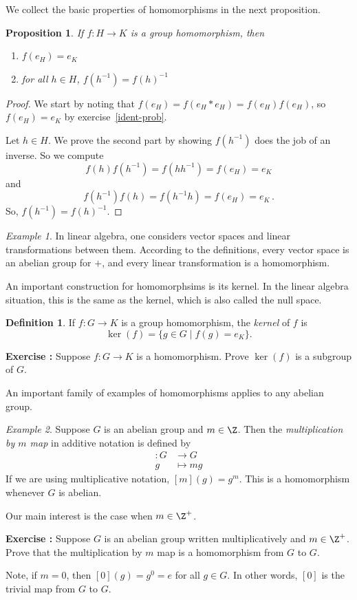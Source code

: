 \documentclass[12pt]{amsart}
\newcounter{probs}
\newenvironment{prob}{%
  \refstepcounter{probs}
  \par\medskip\noindent\textbf{Exercise \theprobs:} }{\par\medskip}
\theoremstyle{plain}
\newtheorem{prop}[thm]{Proposition}
\theoremstyle{definition}
\newtheorem{defn}[thm]{Definition}
\theoremstyle{remark}
\newtheorem*{exam}{Example}
\begin{document}
We collect the basic properties of homomorphisms in the next proposition.
\begin{prop}
If $f:H\to K$ is a group homomorphism, then
\begin{enumerate}
\item $f(e_H) = e_K$
\item for all $h\in H$, $f(h^{-1})=f(h)^{-1}$
\end{enumerate}
\end{prop}
\begin{proof}
  We start by noting that $f(e_H)=f(e_H*e_H) = f(e_H)f(e_H)$, so $f(e_H)=e_K$ by
  exercise~\ref{ident-prob}.
  
  Let $h\in H$.  We prove the second part by showing $f(h^{-1})$ does the job of an
  inverse.  So we compute
  \[ f(h)f(h^{-1}) = f(hh^{-1}) = f(e_H) = e_K\]
  and
  \[ f(h^{-1})f(h) = f(h^{-1}h) = f(e_H) = e_K\,.\]
  So, $f(h^{-1}) = f(h)^{-1}$.
\end{proof}

\begin{exam}
  In linear algebra, one considers vector spaces and linear
  transformations between them.  According to the definitions,
  every vector space is an abelian group for $+$, and every
  linear transformation is a homomorphism.
\end{exam}

An important construction for homomorphsims is its kernel.  In
the linear algebra situation, this is the same as the kernel, which
is also called the null space.
\begin{defn}
 If $f:G\to K$ is a group homomorphism, the \emph{kernel} of $f$ is
 \[ \ker(f) = \{g\in G\mid f(g) = e_K\}.\]
\end{defn}
\begin{prob}
Suppose $f:G\to K$ is a homomorphism.  Prove $\ker(f)$ is a subgroup
of $G$.
\end{prob}

An important family of examples of homomorphisms applies to any
abelian group.
\begin{exam}
  Suppose $G$ is an abelian group and $m\in\Z$.  Then the {\em
    multiplication by $m$ map} in additive notation is defined by
  \begin{align*}
    [m]:G&\to G \\
     g&\mapsto mg
  \end{align*}
  If we are using multiplicative notation, $[m](g) = g^m$.  This is a
  homomorphism whenever $G$ is abelian.
\end{exam}
Our main interest is the case when $m\in\Z^+$.
\begin{prob}
  Suppose $G$ is an abelian group written multiplicatively and
  $m\in\Z^+$.  Prove that the multiplication by $m$ map is a
  homomorphism from $G$ to $G$.
\end{prob}
Note, if $m=0$, then $[0](g)=g^0=e$ for all $g\in G$.  In other words,
$[0]$ is the trivial map from $G$ to $G$.
\end{document}
